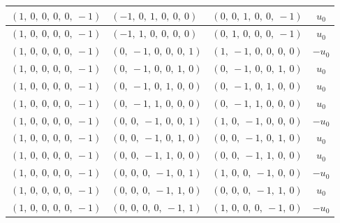 \documentclass[11pt]{article}
\theoremstyle{definition}
\begin{document}
\begin{longtable}{|l|l|l|c|}
    \hline
    $\left( 1, \  0, \  0, \  0, \  0, \  -1\right)$ & $\left( -1, \  0, \  1, \  0, \  0, \  0\right)$ & $\left( 0, \  0, \  1, \  0, \  0, \  -1\right)$ & $u_{0}$ \\
    \hline
    $\left( 1, \  0, \  0, \  0, \  0, \  -1\right)$ & $\left( -1, \  1, \  0, \  0, \  0, \  0\right)$ & $\left( 0, \  1, \  0, \  0, \  0, \  -1\right)$ & $u_{0}$ \\
    \hline
    $\left( 1, \  0, \  0, \  0, \  0, \  -1\right)$ & $\left( 0, \  -1, \  0, \  0, \  0, \  1\right)$ & $\left( 1, \  -1, \  0, \  0, \  0, \  0\right)$ & $- u_{0}$ \\
    \hline
    $\left( 1, \  0, \  0, \  0, \  0, \  -1\right)$ & $\left( 0, \  -1, \  0, \  0, \  1, \  0\right)$ & $\left( 0, \  -1, \  0, \  0, \  1, \  0\right)$ & $u_{0}$ \\
    \hline
    $\left( 1, \  0, \  0, \  0, \  0, \  -1\right)$ & $\left( 0, \  -1, \  0, \  1, \  0, \  0\right)$ & $\left( 0, \  -1, \  0, \  1, \  0, \  0\right)$ & $u_{0}$ \\
    \hline
    $\left( 1, \  0, \  0, \  0, \  0, \  -1\right)$ & $\left( 0, \  -1, \  1, \  0, \  0, \  0\right)$ & $\left( 0, \  -1, \  1, \  0, \  0, \  0\right)$ & $u_{0}$ \\
    \hline
    $\left( 1, \  0, \  0, \  0, \  0, \  -1\right)$ & $\left( 0, \  0, \  -1, \  0, \  0, \  1\right)$ & $\left( 1, \  0, \  -1, \  0, \  0, \  0\right)$ & $- u_{0}$ \\
    \hline
    $\left( 1, \  0, \  0, \  0, \  0, \  -1\right)$ & $\left( 0, \  0, \  -1, \  0, \  1, \  0\right)$ & $\left( 0, \  0, \  -1, \  0, \  1, \  0\right)$ & $u_{0}$ \\
    \hline
    $\left( 1, \  0, \  0, \  0, \  0, \  -1\right)$ & $\left( 0, \  0, \  -1, \  1, \  0, \  0\right)$ & $\left( 0, \  0, \  -1, \  1, \  0, \  0\right)$ & $u_{0}$ \\
    \hline
    $\left( 1, \  0, \  0, \  0, \  0, \  -1\right)$ & $\left( 0, \  0, \  0, \  -1, \  0, \  1\right)$ & $\left( 1, \  0, \  0, \  -1, \  0, \  0\right)$ & $- u_{0}$ \\
    \hline
    $\left( 1, \  0, \  0, \  0, \  0, \  -1\right)$ & $\left( 0, \  0, \  0, \  -1, \  1, \  0\right)$ & $\left( 0, \  0, \  0, \  -1, \  1, \  0\right)$ & $u_{0}$ \\
    \hline
    $\left( 1, \  0, \  0, \  0, \  0, \  -1\right)$ & $\left( 0, \  0, \  0, \  0, \  -1, \  1\right)$ & $\left( 1, \  0, \  0, \  0, \  -1, \  0\right)$ & $- u_{0}$ \\

\end{longtable}
\end{document}
